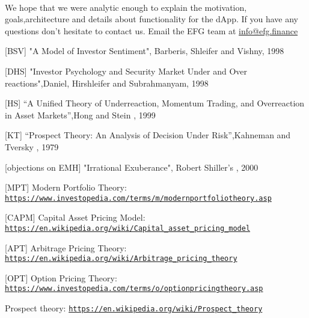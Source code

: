 \documentclass{article}
\begin{document}
\paragraph{ }
We hope that we were analytic enough to explain the motivation, goals,architecture and details about functionality for the dApp. If you have any questions don't hesitate to contact us. Email the EFG team at \href{mailto:info@efg.finance}{info@efg.finance}

\clearpage
\begin{thebibliography}{2}
[BSV] "A Model of Investor Sentiment", Barberis, Shleifer and Vishny, 1998

[DHS] "Investor Psychology and Security Market Under and Over reactions",Daniel, Hirshleifer and Subrahmanyam, 1998

[HS] “A Unified Theory of Underreaction, Momentum Trading, and Overreaction in Asset Markets”,Hong and Stein , 1999

[KT] “Prospect Theory: An Analysis of Decision Under Risk”,Kahneman and Tversky , 1979

[objections on EMH] "Irrational Exuberance", Robert Shiller’s , 2000 

[MPT] Modern Portfolio Theory: \texttt{\url{https://www.investopedia.com/terms/m/modernportfoliotheory.asp}}

[CAPM] Capital Asset Pricing Model: \texttt{\url{https://en.wikipedia.org/wiki/Capital_asset_pricing_model}}

[APT] Arbitrage Pricing Theory: \texttt{\url{https://en.wikipedia.org/wiki/Arbitrage_pricing_theory}}

[OPT] Option Pricing Theory: \texttt{\url{https://www.investopedia.com/terms/o/optionpricingtheory.asp}}

Prospect theory: \texttt{\url{https://en.wikipedia.org/wiki/Prospect_theory}}

\end{thebibliography}
\end{document}
